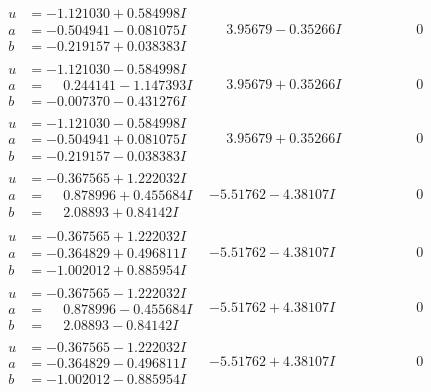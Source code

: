 \documentclass[1p]{elsarticle_modified}
\theoremstyle{definition}
\begin{document}
$$\begin{array}{c|c|c}
\begin{aligned}
u &= -1.121030 + 0.584998 I \\
a &= -0.504941 - 0.081075 I \\
b &= -0.219157 + 0.038383 I\end{aligned}
 & \phantom{-}3.95679 - 0.35266 I & \phantom{-0.000000 } 0 \\ \hline\begin{aligned}
u &= -1.121030 - 0.584998 I \\
a &= \phantom{-}0.244141 - 1.147393 I \\
b &= -0.007370 - 0.431276 I\end{aligned}
 & \phantom{-}3.95679 + 0.35266 I & \phantom{-0.000000 } 0 \\ \hline\begin{aligned}
u &= -1.121030 - 0.584998 I \\
a &= -0.504941 + 0.081075 I \\
b &= -0.219157 - 0.038383 I\end{aligned}
 & \phantom{-}3.95679 + 0.35266 I & \phantom{-0.000000 } 0 \\ \hline\begin{aligned}
u &= -0.367565 + 1.222032 I \\
a &= \phantom{-}0.878996 + 0.455684 I \\
b &= \phantom{-}2.08893 + 0.84142 I\end{aligned}
 & -5.51762 - 4.38107 I & \phantom{-0.000000 } 0 \\ \hline\begin{aligned}
u &= -0.367565 + 1.222032 I \\
a &= -0.364829 + 0.496811 I \\
b &= -1.002012 + 0.885954 I\end{aligned}
 & -5.51762 - 4.38107 I & \phantom{-0.000000 } 0 \\ \hline\begin{aligned}
u &= -0.367565 - 1.222032 I \\
a &= \phantom{-}0.878996 - 0.455684 I \\
b &= \phantom{-}2.08893 - 0.84142 I\end{aligned}
 & -5.51762 + 4.38107 I & \phantom{-0.000000 } 0 \\ \hline\begin{aligned}
u &= -0.367565 - 1.222032 I \\
a &= -0.364829 - 0.496811 I \\
b &= -1.002012 - 0.885954 I\end{aligned}
 & -5.51762 + 4.38107 I & \phantom{-0.000000 } 0 \\ \hline\begin{aligned}

\end{aligned}
\end{array}$$
\end{document}
